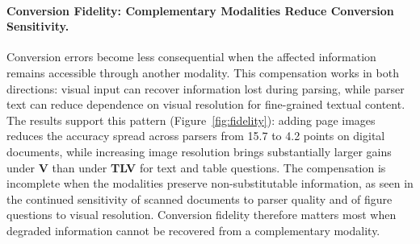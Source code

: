 \documentclass[11pt]{article}
\begin{document}

\paragraph{Conversion Fidelity: Complementary Modalities Reduce Conversion Sensitivity.}
Conversion errors become less consequential when the affected information remains accessible through another modality. This compensation works in both directions: visual input can recover information lost during parsing, while parser text can reduce dependence on visual resolution for fine-grained textual content. The results support this pattern (Figure~\ref{fig:fidelity}): adding page images reduces the accuracy spread across parsers from 15.7 to 4.2 points on digital documents, while increasing image resolution brings substantially larger gains under \textbf{V} than under \textbf{TLV} for text and table questions. The compensation is incomplete when the modalities preserve non-substitutable information, as seen in the continued sensitivity of scanned documents to parser quality and of figure questions to visual resolution. Conversion fidelity therefore matters most when degraded information cannot be recovered from a complementary modality.
\end{document}
